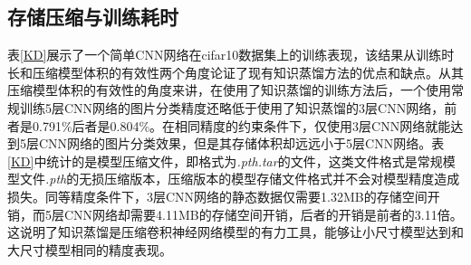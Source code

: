 \subsection{存储压缩与训练耗时}
\label{m1}
表\ref{KD}展示了一个简单CNN网络在cifar10数据集上的训练表现，该结果从训练时长和压缩模型体积的有效性两个角度论证了现有知识蒸馏方法的优点和缺点。从其压缩模型体积的有效性的角度来讲，在使用了知识蒸馏的训练方法后，一个使用常规训练5层CNN网络的图片分类精度还略低于使用了知识蒸馏的3层CNN网络，前者是0.791\%后者是0.804\%。在相同精度的约束条件下，仅使用3层CNN网络就能达到5层CNN网络的图片分类效果，但是其存储体积却远远小于5层CNN网络。表\ref{KD}中统计的是模型压缩文件，即格式为\emph{.pth.tar}的文件，这类文件格式是常规模型文件\emph{.pth}的无损压缩版本，压缩版本的模型存储文件格式并不会对模型精度造成损失。同等精度条件下，3层CNN网络的静态数据仅需要1.32MB的存储空间开销，而5层CNN网络却需要4.11MB的存储空间开销，后者的开销是前者的3.11倍。这说明了知识蒸馏是压缩卷积神经网络模型的有力工具，能够让小尺寸模型达到和大尺寸模型相同的精度表现。
